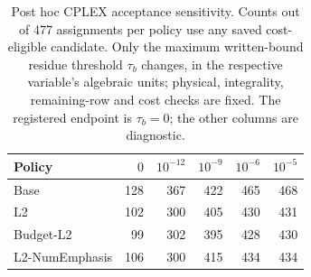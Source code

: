 \begin{table}[htbp]
\centering\small\setlength{\tabcolsep}{6pt}
\caption{Post hoc CPLEX acceptance sensitivity. Counts out of 477 assignments
per policy use any saved cost-eligible candidate. Only the maximum written-bound
residue threshold $\tau_b$ changes, in the respective variable's algebraic units;
physical, integrality, remaining-row and cost checks are fixed. The registered
endpoint is $\tau_b=0$; the other columns are diagnostic.}
\label{tab:orf-large-sensitivity}
\begin{tabular}{lrrrrr}\toprule
Policy & $0$ & $10^{-12}$ & $10^{-9}$ & $10^{-6}$ & $10^{-5}$\\\midrule
Base & 128 & 367 & 422 & 465 & 468\\
L2 & 102 & 300 & 405 & 430 & 431\\
Budget-L2 & 99 & 302 & 395 & 428 & 430\\
L2-NumEmphasis & 106 & 300 & 415 & 434 & 434\\
\bottomrule\end{tabular}\end{table}
